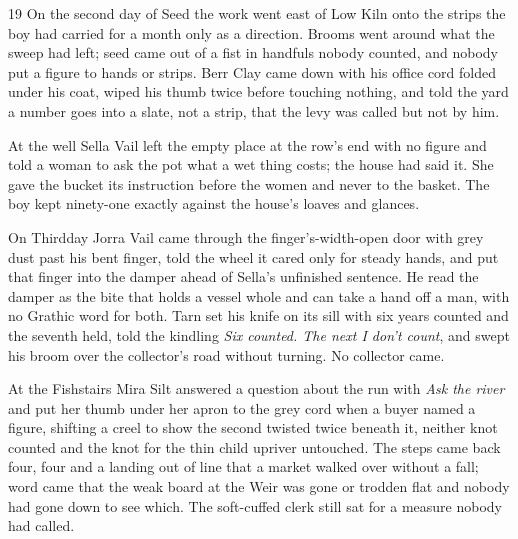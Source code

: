 
\scenebreak


\scenebreak


\scenebreak

\CRtailpiece
\begin{CRchronicle}{19}
On the second day of Seed the work went east of Low Kiln onto the strips the boy had carried for a month only as a direction. Brooms went around what the sweep had left; seed came out of a fist in handfuls nobody counted, and nobody put a figure to hands or strips. Berr Clay came down with his office cord folded under his coat, wiped his thumb twice before touching nothing, and told the yard a number goes into a slate, not a strip, that the levy was called but not by him.

At the well Sella Vail left the empty place at the row’s end with no figure and told a woman to ask the pot what a wet thing costs; the house had said it. She gave the bucket its instruction before the women and never to the basket. The boy kept ninety-one exactly against the house’s loaves and glances.

On Thirdday Jorra Vail came through the finger’s-width-open door with grey dust past his bent finger, told the wheel it cared only for steady hands, and put that finger into the damper ahead of Sella’s unfinished sentence. He read the damper as the bite that holds a vessel whole and can take a hand off a man, with no Grathic word for both. Tarn set his knife on its sill with six years counted and the seventh held, told the kindling \emph{Six counted. The next I don’t count}, and swept his broom over the collector’s road without turning. No collector came.

At the Fishstairs Mira Silt answered a question about the run with \emph{Ask the river} and put her thumb under her apron to the grey cord when a buyer named a figure, shifting a creel to show the second twisted twice beneath it, neither knot counted and the knot for the thin child upriver untouched. The steps came back four, four and a landing out of line that a market walked over without a fall; word came that the weak board at the Weir was gone or trodden flat and nobody had gone down to see which. The soft-cuffed clerk still sat for a measure nobody had called.


\end{CRchronicle}
